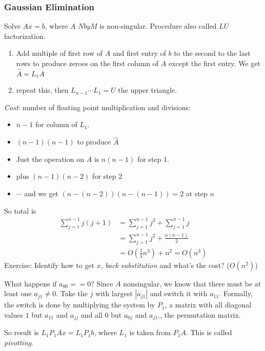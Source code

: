 \subsubsection{Gaussian Elimination}
\label{sec:gaussian}
Solve $Ax=b$, where $A$ $NbyM$ is non-singular. Procedure also called $LU$
factorization.
\begin{enumerate}
\item Add multiple of first row of $A$ and first entry of $b$ to the
  second to the last rows to produce zeroes on the first column of $A$
  except the first entry. We get $\hat A = L_1A$
\item repeat this, then $L_{n-1}\cdots L_1=U$ the upper triangle.
\end{enumerate}

\emph{Cost}: number of floating point multiplication and divisions:
\begin{itemize}
\item $n-1$ for column of $L_1$.
\item $(n-1)(n-1)$  to produce $\hat A$
\item Just the operation on $A$ is $n(n-1)$ for step 1.
\item plus $(n-1)(n-2)$ for step 2
\item $\cdots$ and we get $(n-(n-2))(n-(n-1)) = 2$ at step $n$
\end{itemize}
So total is 
\begin{align*}
  \sum_{j=1}^{n-1}j(j+1)&= \sum_{j=1}^{n-1}j^2 + \sum_{j=1}^{n-1}j\\
&=\sum_{j=1}^{n-1}j^2 + \frac{n(n-1)}{2}\\
&= O(\frac{1}{3}n^3) + n^2 = O(n^3)
\end{align*}
Exercise: Identify how to get $x$, \emph{back substitution} and what's
the cost? ($O(n^2)$)

What happens if $a_{00} == 0$?
Since $A$ nonsingular, we know that there must be at least one
$a_{j1}\neq 0$. Take the $j$ with largest $|a_{j1}|$ and switch it
with $a_{11}$. Formally, the switch is done by multiplying the system
by $P_1$, a matrix with all diagonal values $1$ but $a_{11}$ and
$a_{jj}$ and all 0 but $a_{0j}$ and $a_{j1}$., the permutation matrix.

So result is $L_1P_1Ax = L_1P_1b$, where $L_1$ is taken from
$P_1A$. This is called \emph{pivotting}.


